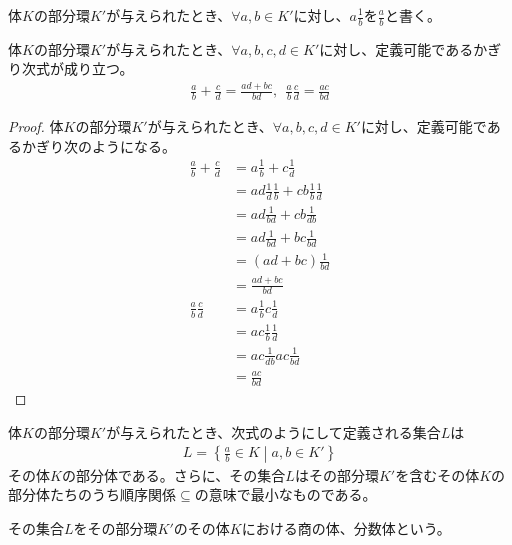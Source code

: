 \documentclass[dvipdfmx]{jsarticle}
\begin{document}
\begin{dfn}
体$K$の部分環$K'$が与えられたとき、$\forall a,b \in K'$に対し、$a\frac{1}{b}$を$\frac{a}{b}$と書く。
\end{dfn}
\begin{thm}\label{3.3.2.31}
体$K$の部分環$K'$が与えられたとき、$\forall a,b,c,d \in K'$に対し、定義可能であるかぎり次式が成り立つ。
\begin{align*}
\frac{a}{b} + \frac{c}{d} = \frac{ad + bc}{bd},\ \ \frac{a}{b}\frac{c}{d} = \frac{ac}{bd}
\end{align*}
\end{thm}
\begin{proof}
体$K$の部分環$K'$が与えられたとき、$\forall a,b,c,d \in K'$に対し、定義可能であるかぎり次のようになる。
\begin{align*}
\frac{a}{b} + \frac{c}{d} &= a\frac{1}{b} + c\frac{1}{d}\\
&= ad\frac{1}{d}\frac{1}{b} + cb\frac{1}{b}\frac{1}{d}\\
&= ad\frac{1}{bd} + cb\frac{1}{db}\\
&= ad\frac{1}{bd} + bc\frac{1}{bd}\\
&= (ad + bc)\frac{1}{bd}\\
&= \frac{ad + bc}{bd}\\
\frac{a}{b}\frac{c}{d} &= a\frac{1}{b}c\frac{1}{d}\\
&= ac\frac{1}{b}\frac{1}{d}\\
&= ac\frac{1}{db}ac\frac{1}{bd}\\
&= \frac{ac}{bd}
\end{align*}
\end{proof}
\begin{thm}\label{3.3.2.32}
体$K$の部分環$K'$が与えられたとき、次式のようにして定義される集合$L$は
\begin{align*}
L = \left\{ \frac{a}{b} \in K \middle| a,b \in K' \right\}
\end{align*}
その体$K$の部分体である。さらに、その集合$L$はその部分環$K'$を含むその体$K$の部分体たちのうち順序関係$\subseteq$の意味で最小なものである。
\end{thm}
\begin{dfn}
その集合$L$をその部分環$K'$のその体$K$における商の体、分数体という。
\end{dfn}
\end{document}
